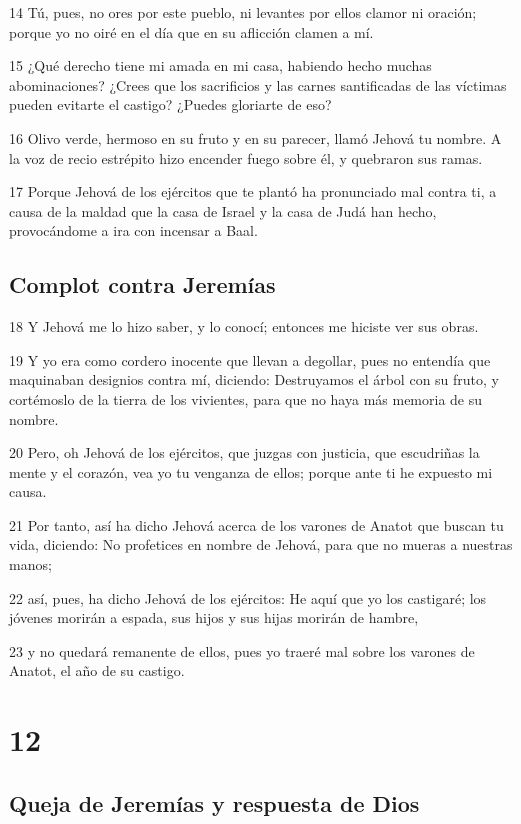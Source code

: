 \par 14 Tú, pues, no ores por este pueblo, ni levantes por ellos clamor ni oración; porque yo no oiré en el día que en su aflicción clamen a mí.
\par 15 ¿Qué derecho tiene mi amada en mi casa, habiendo hecho muchas abominaciones? ¿Crees que los sacrificios y las carnes santificadas de las víctimas pueden evitarte el castigo? ¿Puedes gloriarte de eso?
\par 16 Olivo verde, hermoso en su fruto y en su parecer, llamó Jehová tu nombre. A la voz de recio estrépito hizo encender fuego sobre él, y quebraron sus ramas.
\par 17 Porque Jehová de los ejércitos que te plantó ha pronunciado mal contra ti, a causa de la maldad que la casa de Israel y la casa de Judá han hecho, provocándome a ira con incensar a Baal.

\section*{Complot contra Jeremías}

\par 18 Y Jehová me lo hizo saber, y lo conocí; entonces me hiciste ver sus obras.
\par 19 Y yo era como cordero inocente que llevan a degollar, pues no entendía que maquinaban designios contra mí, diciendo: Destruyamos el árbol con su fruto, y cortémoslo de la tierra de los vivientes, para que no haya más memoria de su nombre.
\par 20 Pero, oh Jehová de los ejércitos, que juzgas con justicia, que escudriñas la mente y el corazón, vea yo tu venganza de ellos; porque ante ti he expuesto mi causa.
\par 21 Por tanto, así ha dicho Jehová acerca de los varones de Anatot que buscan tu vida, diciendo: No profetices en nombre de Jehová, para que no mueras a nuestras manos;
\par 22 así, pues, ha dicho Jehová de los ejércitos: He aquí que yo los castigaré; los jóvenes morirán a espada, sus hijos y sus hijas morirán de hambre,
\par 23 y no quedará remanente de ellos, pues yo traeré mal sobre los varones de Anatot, el año de su castigo.

\chapter{12}

\section*{Queja de Jeremías y respuesta de Dios}

